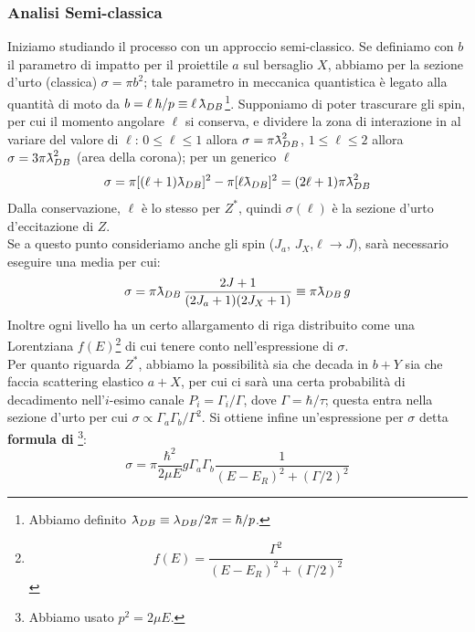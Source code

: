 \subsubsection{Analisi Semi-classica}
Iniziamo studiando il processo con un approccio semi-classico. Se definiamo con $b$ il parametro di impatto per il proiettile $a$ sul bersaglio $X$, abbiamo per la sezione d'urto (classica) $\sigma = \pi b^2$; tale parametro in meccanica quantistica è legato alla quantità di moto da $b = \ell \: \hbar/p\equiv \ell\,\lambdabar_{DB}$\footnote{Abbiamo definito $\lambdabar_{DB}\equiv \lambda_{DB}/2\pi = \hbar/p$.}. Supponiamo di poter trascurare gli spin, per cui il momento angolare $\ell$ si conserva, e dividere la zona di interazione in  al variare del valore di $\ell$: $0\leq \ell \leq 1$ allora $\sigma = \pi\lambdabar^2_{DB}$, $1\leq \ell \leq 2$ allora $\sigma = 3\pi\lambdabar^2_{DB}$ (area della corona); per un generico $\ell$
$$\sigma = \pi [(\ell+1)\lambdabar_{DB}]^2 - \pi[\ell\lambdabar_{DB}]^2 = (2\ell +1) \pi\lambdabar^2_{DB}$$
Dalla conservazione, $\ell$ è lo stesso per $Z^*$, quindi $\sigma(\ell)$ è la sezione d'urto d'eccitazione di $Z$.\\
Se a questo punto consideriamo anche gli spin ($J_a$, $J_X$,$\ell\to J$), sarà necessario eseguire una media per cui:
$$\sigma = \pi\lambdabar_{DB}\,\frac{2J+1}{(2J_a+1)(2J_X+1)}\equiv \pi\lambdabar_{DB}\,g$$
Inoltre ogni livello ha un certo allargamento di riga distribuito come una Lorentziana $f(E)$\footnote{$$f(E)=\frac{\Gamma^2}{(E-E_R)^2+(\Gamma/2)^2}$$} di cui tenere conto nell'espressione di $\sigma$.\\
Per quanto riguarda $Z^*$, abbiamo la possibilità sia che decada in $b+Y$ sia che faccia scattering elastico $a+X$, per cui ci sarà una certa probabilità di decadimento nell'$i$-esimo canale $P_i = \Gamma_i/\Gamma$, dove $\Gamma=\hbar/\tau$; questa entra nella sezione d'urto per cui $\sigma\propto \Gamma_a\Gamma_b/\Gamma^2$. Si ottiene infine un'espressione per $\sigma$ detta \textbf{formula di \BW}\footnote{Abbiamo usato $p^2 = 2\mu E$.}:
$$\sigma = \pi\frac{\hbar^2}{2\mu E}g\Gamma_a\Gamma_b \frac{1}{(E-E_R)^2+(\Gamma/2)^2}$$


